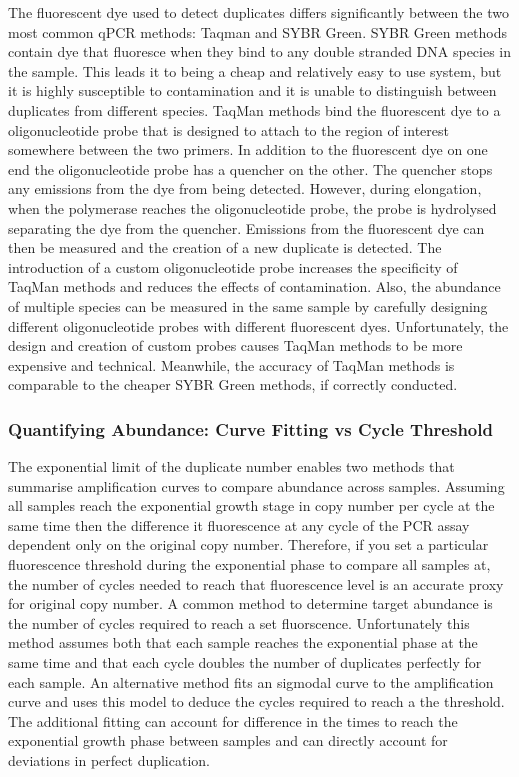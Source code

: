 \documentclass[../main.tex]{subfiles}
\begin{document}
The fluorescent dye used to detect duplicates differs significantly between the two most common qPCR methods: Taqman and SYBR Green. SYBR Green methods contain dye that fluoresce when they bind to any double stranded DNA species in the sample. This leads it to being a cheap and relatively easy to use system, but it is highly susceptible to contamination and it is unable to distinguish between duplicates from different species. TaqMan methods bind the fluorescent dye to a oligonucleotide probe that is designed to attach to the region of interest somewhere between the two primers. In addition to the fluorescent dye on one end the oligonucleotide probe has a quencher on the other. The quencher stops any emissions from the dye from being detected. However, during elongation, when the polymerase reaches the oligonucleotide probe, the probe is hydrolysed separating the dye from the quencher. Emissions from the fluorescent dye can then be measured and the creation of a new duplicate is detected. The introduction of a custom oligonucleotide probe increases the specificity of TaqMan methods and reduces the effects of contamination. Also, the abundance of multiple species can be measured in the same sample by carefully designing different oligonucleotide probes with different fluorescent dyes. Unfortunately, the design and creation of custom probes causes TaqMan methods to be more expensive and technical. Meanwhile, the accuracy of TaqMan methods is comparable to the cheaper SYBR Green methods, if correctly conducted. \cite{Tajadini2014}

\subsubsection{Quantifying Abundance: Curve Fitting vs Cycle Threshold}

The exponential limit of the duplicate number enables two methods that summarise amplification curves to compare abundance across samples. Assuming all samples reach the exponential growth stage in copy number per cycle at the same time then the difference it fluorescence at any cycle of the PCR assay dependent only on the original copy number. Therefore, if you set a particular fluorescence threshold during the exponential phase to compare all samples at, the number of cycles needed to reach that fluorescence level is an accurate proxy for original copy number. A common method to determine target abundance is the number of cycles required to reach a set fluorscence. Unfortunately this method assumes both that each sample reaches the exponential phase at the same time and that each cycle doubles the number of duplicates perfectly for each sample. An alternative method fits an sigmodal curve to the amplification curve and uses this model to deduce the cycles required to reach a the threshold. The additional fitting can account for difference in the times to reach the exponential growth phase between samples and can directly account for deviations in perfect duplication. 
\end{document}
